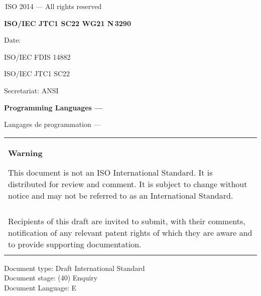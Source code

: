 

\thispagestyle{empty}
{\raisebox{.35ex}{\smaller\copyright}}\,ISO 2014 --- All rights reserved
\vspace{2ex}

\begin{flushright}
\textbf{ISO/IEC JTC1 SC22 WG21 N\,\LARGE3290}

Date: \reldate

ISO/IEC FDIS 14882

ISO/IEC JTC1 SC22

Secretariat: ANSI

\end{flushright}

\vfill

\textbf{\LARGE Programming Languages --- \Cpp}

Langages de programmation --- \Cpp

\vfill

\begin{tabular}{|p{\hsize}|}
\hline
\begin{center}
\textbf{Warning}
\end{center}

\vspace{2ex}

This document is not an ISO International Standard. It is distributed
for review and comment. It is subject to change without notice and may
not be referred to as an International Standard.\\\\

Recipients of this draft are invited to submit, with their comments,
notification of any relevant patent rights of which they are aware
and to provide supporting documentation.\\\\
\hline
\end{tabular}

\vfill
\noindent
Document type: Draft International Standard\\
Document stage: (40) Enquiry\\
Document Language: E
\pagebreak

\thispagestyle{cpppage}

